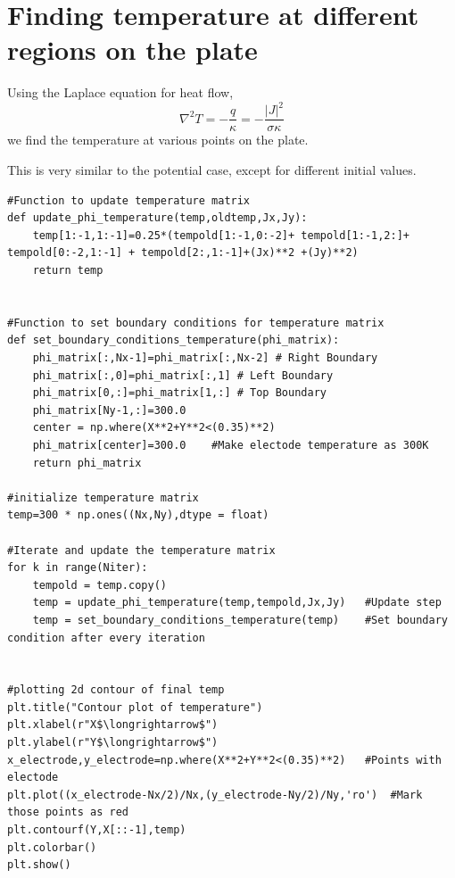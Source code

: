 \documentclass[11pt, a4paper]{article}
\begin{document}
\section{Finding temperature at different regions on the plate}
Using the Laplace equation for heat flow,
\begin{equation}
    \nabla^2 T = -\frac{q}{\kappa} = -\frac{|J|^2}{\sigma \kappa}
\end{equation}
we find the temperature at various points on the plate.

This is very similar to the potential case, except for different initial values.
\begin{lstlisting}
#Function to update temperature matrix
def update_phi_temperature(temp,oldtemp,Jx,Jy):
    temp[1:-1,1:-1]=0.25*(tempold[1:-1,0:-2]+ tempold[1:-1,2:]+ tempold[0:-2,1:-1] + tempold[2:,1:-1]+(Jx)**2 +(Jy)**2)
    return temp


#Function to set boundary conditions for temperature matrix
def set_boundary_conditions_temperature(phi_matrix):
    phi_matrix[:,Nx-1]=phi_matrix[:,Nx-2] # Right Boundary
    phi_matrix[:,0]=phi_matrix[:,1] # Left Boundary
    phi_matrix[0,:]=phi_matrix[1,:] # Top Boundary
    phi_matrix[Ny-1,:]=300.0
    center = np.where(X**2+Y**2<(0.35)**2)
    phi_matrix[center]=300.0    #Make electode temperature as 300K
    return phi_matrix

#initialize temperature matrix
temp=300 * np.ones((Nx,Ny),dtype = float)

#Iterate and update the temperature matrix
for k in range(Niter):
    tempold = temp.copy()
    temp = update_phi_temperature(temp,tempold,Jx,Jy)   #Update step
    temp = set_boundary_conditions_temperature(temp)    #Set boundary condition after every iteration


#plotting 2d contour of final temp
plt.title("Contour plot of temperature")
plt.xlabel(r"X$\longrightarrow$")
plt.ylabel(r"Y$\longrightarrow$")
x_electrode,y_electrode=np.where(X**2+Y**2<(0.35)**2)   #Points with electode
plt.plot((x_electrode-Nx/2)/Nx,(y_electrode-Ny/2)/Ny,'ro')  #Mark those points as red
plt.contourf(Y,X[::-1],temp)
plt.colorbar()
plt.show()
\end{lstlisting}
\end{document}
